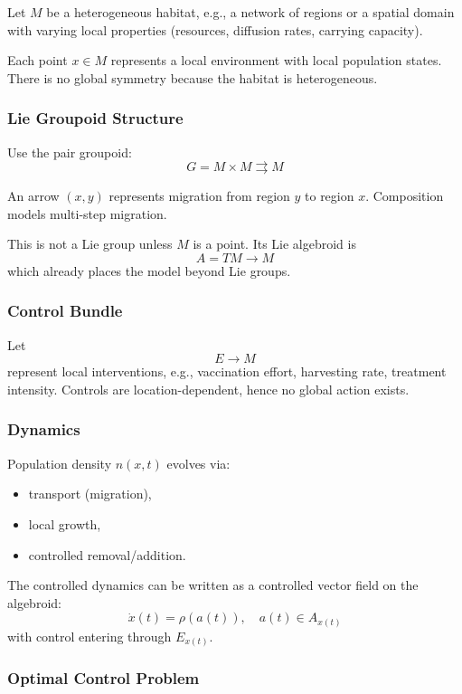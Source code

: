 \documentclass{article}
\begin{document}
Let $M$ be a heterogeneous habitat, e.g., a network of regions or a spatial domain with varying local properties (resources, diffusion rates, carrying capacity).  

Each point $x \in M$ represents a local environment with local population states. There is no global symmetry because the habitat is heterogeneous.

\subsubsection*{Lie Groupoid Structure}

Use the pair groupoid:
\[
G = M \times M \rightrightarrows M
\]

An arrow $(x, y)$ represents migration from region $y$ to region $x$. Composition models multi-step migration.  

This is not a Lie group unless $M$ is a point. Its Lie algebroid is
\[
A = TM \to M
\]
which already places the model beyond Lie groups.

\subsubsection*{Control Bundle}

Let
\[
E \to M
\]
represent local interventions, e.g., vaccination effort, harvesting rate, treatment intensity. Controls are location-dependent, hence no global action exists.

\subsubsection*{Dynamics}

Population density $n(x,t)$ evolves via:
\begin{itemize}
    \item transport (migration),
    \item local growth,
    \item controlled removal/addition.
\end{itemize}

The controlled dynamics can be written as a controlled vector field on the algebroid:
\[
\dot{x}(t) = \rho(a(t)), \quad a(t) \in A_{x(t)}
\]
with control entering through $E_{x(t)}$.

\subsubsection*{Optimal Control Problem}
\end{document}
